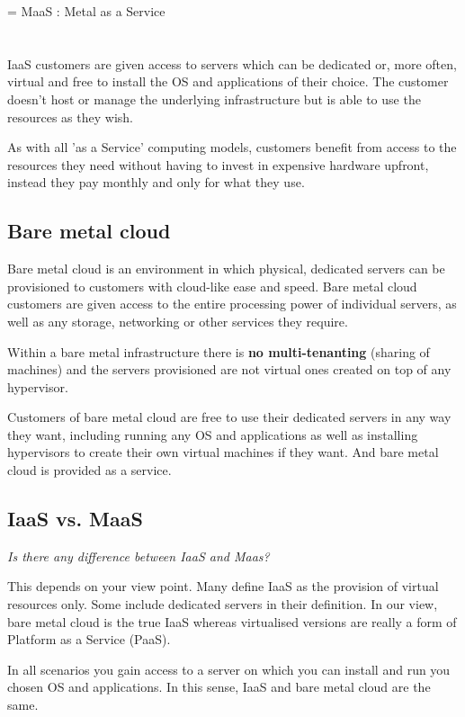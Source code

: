 \chapname = {MaaS : Metal as a Service}
\chapter{\the\chapname}

IaaS customers are given access to servers which can be dedicated or, more often, virtual and free to install the OS and applications of their choice. The customer doesn't host or manage the underlying infrastructure but is able to use the resources as they wish.

As with all 'as a Service' computing models, customers benefit from access to the resources they need without having to invest in expensive hardware upfront, instead they pay monthly and only for what they use.

\section{Bare metal cloud}

Bare metal cloud is an environment in which physical, dedicated servers can be provisioned to customers with cloud-like ease and speed. Bare metal cloud customers are given access to the entire processing power of individual servers, as well as any storage, networking or other services they require.

Within a bare metal infrastructure there is \textbf{no multi-tenanting} (sharing of machines) and the servers provisioned are not virtual ones created on top of any hypervisor. 

Customers of bare metal cloud are free to use their dedicated servers in any way they want, including running any OS and applications as well as installing hypervisors to create their own virtual machines if they want. And bare metal cloud is provided as a service.

\section{IaaS vs. MaaS}

\textit{Is there any difference between IaaS and Maas?}

This depends on your view point. Many define IaaS as the provision of virtual resources only. Some include dedicated servers in their definition. In our view, bare metal cloud is the true IaaS whereas virtualised versions are really a form of Platform as a Service (PaaS).

In all scenarios you gain access to a server on which you can install and run you chosen OS and applications. In this sense, IaaS and bare metal cloud are the same.

